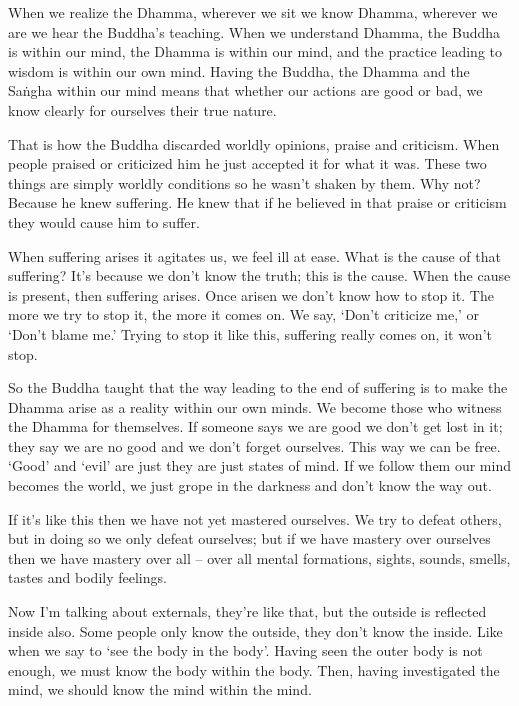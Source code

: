 When we realize the Dhamma, wherever we sit we know Dhamma, wher\-ever we are we hear the Buddha's teaching. When we understand Dhamma, the Buddha is within our mind, the Dhamma is within our mind, and the practice leading to wisdom is within our own mind. Having the Buddha, the Dhamma and the Sa\.ngha within our mind means that whether our actions are good or bad, we know clearly for ourselves their true nature. 

That is how the Buddha discarded worldly opinions, praise and criticism. When people praised or criticized him he just accepted it for what it was. These two things are simply worldly conditions so he wasn't shaken by them. Why not? Because he knew suffering. He knew that if he believed in that praise or criticism they would cause him to suffer. 

When suffering arises it agitates us, we feel ill at ease. What is the cause of that suffering? It's because we don't know the truth; this is the cause. When the cause is present, then suffering arises. Once arisen we don't know how to stop it. The more we try to stop it, the more it comes on. We say, `Don't criticize me,' or `Don't blame me.' Trying to stop it like this, suffering really comes on, it won't stop. 

So the Buddha taught that the way leading to the end of suffering is to make the Dhamma arise as a reality within our own minds. We become those who witness the Dhamma for themselves. If someone says we are good we don't get lost in it; they say we are no good and we don't forget ourselves. This way we can be free. `Good' and `evil' are just  they are just states of mind. If we follow them our mind becomes the world, we just grope in the darkness and don't know the way out. 

If it's like this then we have not yet mastered ourselves. We try to defeat others, but in doing so we only defeat ourselves; but if we have mastery over ourselves then we have mastery over all -- over all mental formations, sights, sounds, smells, tastes and bodily feelings. 

Now I'm talking about externals, they're like that, but the outside is reflected inside also. Some people only know the outside, they don't know the inside. Like when we say to `see the body in the body'. Having seen the outer body is not enough, we must know the body within the body. Then, having investigated the mind, we should know the mind within the mind. 

